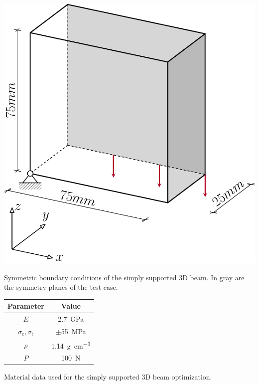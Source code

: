 \begin{marginfigure}
    \centering
    \includegraphics[width=\linewidth]{figures/06_DMO/00_supported_bc/supported_3D_symm.pdf}
    \caption{Symmetric boundary conditions of the simply supported 3D beam. In gray are the symmetry planes of the test case.}
    \label{fig:06_symm_support_bc} 
\end{marginfigure}

\begin{margintable}
    \small
    \centering
    \begin{tabular}{cc}
    \toprule
    \textbf{Parameter}        & \textbf{Value} \\ \midrule
    $E$              & \qty{2.7}{GPa}     \\
    $\sigma_\text{c}, \sigma_\text{t}$ & $\pm $\qty{55}{MPa} \\
    $\rho$              & \qty{1.14}{\gram\per\cubic\centi\metre}   \\
    $P$              & \qty{100}{N}   \\
    \bottomrule
    \end{tabular}
    \caption{Material data used for the simply supported 3D beam optimization.}
    \label{tab:06_3D_supp_mat}
\end{margintable}

